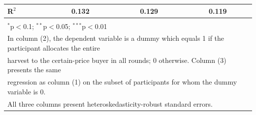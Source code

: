 \begin{table}[!htbp]
\begin{tabular}{@{\extracolsep{5pt}}lccc}
R$^{2}$ & 0.132 & 0.129 & 0.119 \\ 
\hline 
\hline \\[-1.8ex] 
\multicolumn{4}{l}{$^{*}$p$<$0.1; $^{**}$p$<$0.05; $^{***}$p$<$0.01} \\ 
\multicolumn{4}{l}{In column (2), the dependent variable is a dummy which equals 1 if the participant allocates the entire} \\ 
\multicolumn{4}{l}{harvest to the certain-price buyer in all rounds; 0 otherwise. Column (3) presents the same} \\ 
\multicolumn{4}{l}{regression as column (1) on the subset of participants for whom the dummy variable is 0.} \\ 
\multicolumn{4}{l}{All three columns present heteroskedasticity-robust standard errors.} \\ 
\end{tabular} 
\end{table} 
